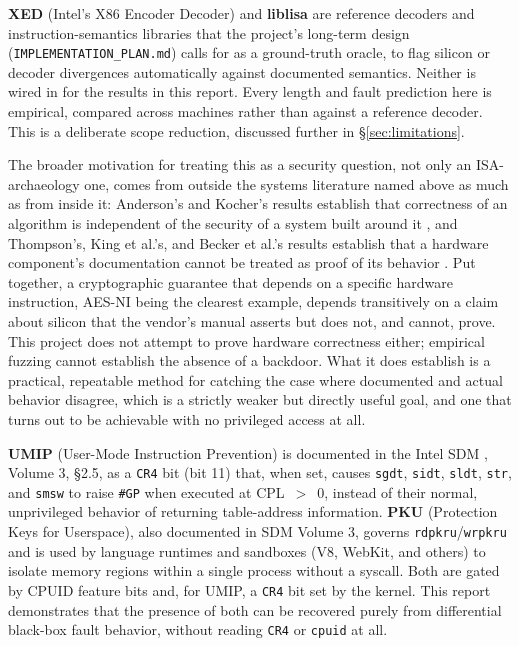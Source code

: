\documentclass[11pt]{article}
\newcommand{\code}[1]{\texttt{#1}}
\begin{document}
\textbf{XED} (Intel's X86 Encoder Decoder) and \textbf{liblisa} are
reference decoders and instruction-semantics libraries that the project's
long-term design (\code{IMPLEMENTATION\_PLAN.md}) calls for as a
ground-truth oracle, to flag silicon or decoder divergences automatically
against documented semantics. Neither is wired in for the results in this
report. Every length and fault prediction here is empirical, compared
across machines rather than against a reference decoder. This is a
deliberate scope reduction, discussed further in \S\ref{sec:limitations}.

The broader motivation for treating this as a security question, not only
an ISA-archaeology one, comes from outside the systems literature named
above as much as from inside it: Anderson's and Kocher's results
establish that correctness of an algorithm is independent of the security
of a system built around it \cite{anderson1993, kocher1996}, and
Thompson's, King et al.'s, and Becker et al.'s results establish that a
hardware component's documentation cannot be treated as proof of its
behavior \cite{thompson1984, king2008, becker2013}. Put together, a
cryptographic guarantee that depends on a specific hardware instruction,
AES-NI being the clearest example, depends transitively on a claim about
silicon that the vendor's manual asserts but does not, and cannot, prove.
This project does not attempt to prove hardware correctness either;
empirical fuzzing cannot establish the absence of a backdoor. What it
does establish is a practical, repeatable method for catching the case
where documented and actual behavior disagree, which is a strictly weaker
but directly useful goal, and one that turns out to be achievable with no
privileged access at all.

\textbf{UMIP} (User-Mode Instruction Prevention) is documented in the
Intel SDM \cite{intelsdm}, Volume 3, \S2.5, as a \code{CR4} bit (bit 11)
that, when set, causes \code{sgdt}, \code{sidt}, \code{sldt}, \code{str},
and \code{smsw} to raise \code{\#GP} when executed at CPL~$>$~0, instead
of their normal, unprivileged behavior of returning table-address
information. \textbf{PKU} (Protection Keys for Userspace), also
documented in SDM Volume 3, governs \code{rdpkru}/\code{wrpkru} and is
used by language runtimes and sandboxes (V8, WebKit, and others) to
isolate memory regions within a single process without a syscall. Both
are gated by CPUID feature bits and, for UMIP, a \code{CR4} bit set by
the kernel. This report demonstrates that the presence of both can be
recovered purely from differential black-box fault behavior, without
reading \code{CR4} or \code{cpuid} at all.
\end{document}
